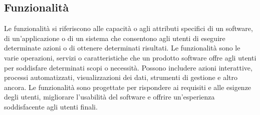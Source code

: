 \subsection*{Funzionalità} 
Le funzionalità si riferiscono alle capacità o agli attributi specifici di un software, di un'applicazione o di un sistema che consentono agli utenti di eseguire determinate azioni o di ottenere determinati risultati. Le funzionalità sono le varie operazioni, servizi o caratteristiche che un prodotto software offre agli utenti per soddisfare determinati scopi o necessità. Possono includere azioni interattive, processi automatizzati, visualizzazioni dei dati, strumenti di gestione e altro ancora. Le funzionalità sono progettate per rispondere ai requisiti e alle esigenze degli utenti, migliorare l'usabilità del software e offrire un'esperienza soddisfacente agli utenti finali.
